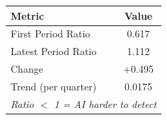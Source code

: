 \begin{tabular}{lc}
\toprule
\textbf{Metric} & \textbf{Value} \\
\midrule
First Period Ratio & 0.617 \\
Latest Period Ratio & 1.112 \\
Change & +0.495 \\
Trend (per quarter) & 0.0175 \\
\midrule
\multicolumn{2}{l}{\textit{Ratio $<$ 1 = AI harder to detect}} \\
\bottomrule
\end{tabular}